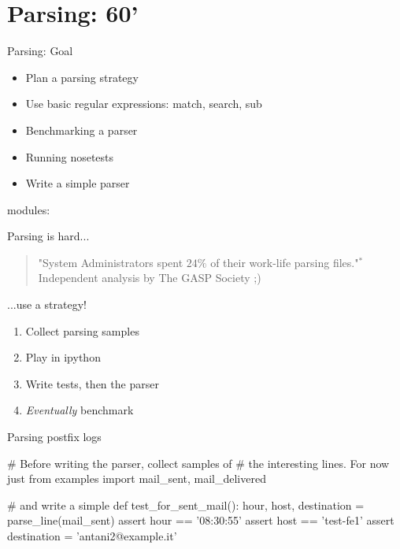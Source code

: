 \section{Parsing: 60'}

\begin{frame}[fragile]{Parsing: Goal}
\begin{itemize}
\item Plan a parsing strategy
\item Use basic regular expressions: match, search, sub
\item Benchmarking a parser
\item Running nosetests
\item Write a simple parser
\end{itemize}
modules: 
\end{frame}


\begin{frame}[fragile]{Parsing is hard...}
\begin{verse}
"System Administrators spent $24\%$ of
 their work-life parsing files."$^{*}$\\
\hfill *Independent analysis by The GASP Society ;)
\end{verse}
\end{frame}


\begin{frame}[fragile]{...use a strategy!}
\begin{enumerate}
\Large
\item Collect parsing samples
\item Play in ipython
\item Write tests, then the parser
\item \emph{Eventually} benchmark
\end{enumerate}
\end{frame}



\begin{frame}[fragile]{Parsing postfix logs}
\begin{pythoncode}
# Before writing the parser, collect samples of
#  the interesting lines. For now just 
from examples import mail_sent, mail_delivered

# and write a simple 
def test_for_sent_mail():
    hour, host, destination = parse_line(mail_sent)
    assert hour == '08:30:55'
    assert host == 'test-fe1'
    assert destination = 'antani2@example.it'

\end{pythoncode}
\end{frame}


